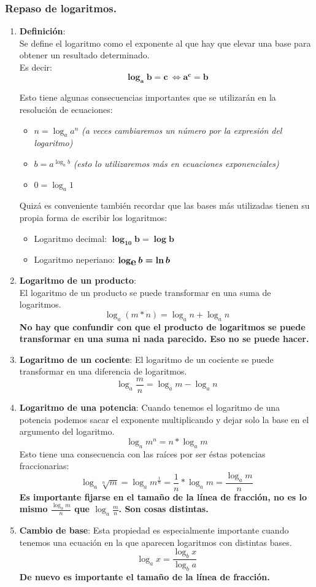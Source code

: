 \documentclass[a4paper,11pt,answers]{exam}
\begin{document}
\subsubsection{Repaso de logaritmos.}\label{repaso_logaritmos}
\begin{enumerate}
\item \textbf{Definición}:\\
  Se define el logaritmo como el exponente al que hay que elevar una base para obtener un
  resultado determinado.\\
  Es decir:
  \[\boldsymbol{\log_a b = c\ \Leftrightarrow a^c = b}\]

  Esto tiene algunas consecuencias importantes que se utilizarán en la resolución de ecuaciones:
  \begin{itemize}
  \item $n = \log_a a^n$ \emph{(a veces cambiaremos un número por la expresión del logaritmo)}
  \item $b = a^{\log_a b}$ \emph{(esto lo utilizaremos más en ecuaciones exponenciales)}
  \item $0 = \log_a 1$
  \end{itemize}

  Quizá es conveniente también recordar que las bases más utilizadas tienen su propia forma de
  escribir los logaritmos:
  \begin{itemize}
  \item Logaritmo decimal: $\boldsymbol{\log_{10} b = \log b}$
  \item Logaritmo neperiano: $\boldsymbol{\log_{\text{\textbf{\large e}}} b = \ln b}$
  \end{itemize}
\item \textbf{Logaritmo de un producto}:\\
  El logaritmo de un producto se puede transformar en una suma de logaritmos.
  \[\log_a (m*n) = \log_a n + \log_a n\]
  \textbf{No hay que confundir con que el producto de logaritmos se puede transformar en
    una suma ni nada parecido. Eso no se puede hacer.}
\item \textbf{Logaritmo de un cociente}:
  El logaritmo de un cociente se puede transformar en una diferencia de logaritmos.
  \[\log_a \frac{m}{n} = \log_a m - \log_a n\]
\item \textbf{Logaritmo de una potencia}:
  Cuando tenemos el logaritmo de una potencia podemos sacar el exponente multiplicando y dejar
  solo la base en el argumento del logaritmo.
  \[\log_a m^n = n *\log_a m\]
  Esto tiene una consecuencia con las raíces por ser éstas potencias fraccionarias:
  \[\log_a \sqrt[n]{m} = \log_a m^\frac{1}{n} = \frac{1}{n}* \log_a m = \frac{\log_a m}{n}\]
  \textbf{Es importante fijarse en el tamaño de la línea de fracción, no es lo mismo
    $\frac{\log_a m}{n}$ que $\log_a \frac{m}{n}$. Son cosas distintas.}
\item \textbf{Cambio de base}:
  Esta propiedad es especialmente importante cuando tenemos una ecuación en la que aparecen
  logaritmos con distintas bases.
  \[\log_a x = \frac{\log_b x}{\log_b a}\]
  \textbf{De nuevo es importante el tamaño de la línea de fracción.}
\end{enumerate}
\end{document}
